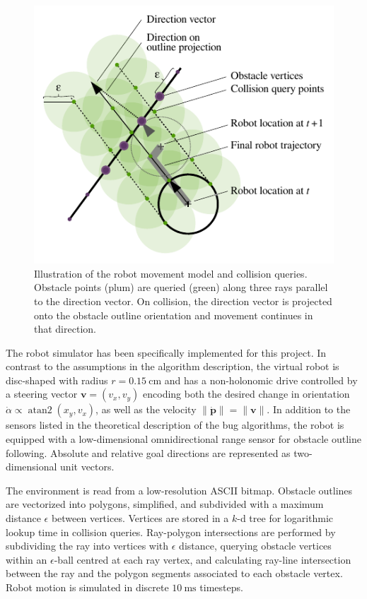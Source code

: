 \documentclass[letterpaper,10pt,conference]{ieeeconf}
\renewcommand{\vec}[1]{\bm{#1}}
\DeclareMathOperator{\atantwo}{atan2}
\begin{document}
\begin{figure}
	\centering
	\includegraphics{media/robot_environment.pdf}
	\caption{Illustration of the robot movement model and collision queries. Obstacle points (plum) are queried (green) along three rays parallel to the direction vector. On collision, the direction vector is projected onto the obstacle outline orientation and movement continues in that direction.}
	\label{fig:robot_environment}
\end{figure}

The robot simulator has been specifically implemented for this project. In contrast to the assumptions in the algorithm description, the virtual robot is disc-shaped with radius $r = \SI{0.15}{\centi\meter}$ and has a non-holonomic drive controlled by a steering vector $\vec v = (v_x, v_y)$ encoding both the desired change in orientation $\dot \alpha \propto \atantwo(x_y, v_x)$, as well as the velocity $\| \dot {\vec p} \| = \|\vec v\|$. In addition to the sensors listed in the theoretical description of the bug algorithms, the robot is equipped with a low-dimensional omnidirectional range sensor for obstacle outline following. Absolute and relative goal directions are represented as two-dimensional unit vectors.

The environment is read from a low-resolution ASCII bitmap. Obstacle outlines are vectorized into polygons, simplified, and subdivided with a maximum distance $\epsilon$ between vertices. Vertices are stored in a $k$-d tree \cite{bentley1975multidimensional} for logarithmic lookup time in collision queries. Ray-polygon intersections are performed by subdividing the ray into vertices with $\epsilon$ distance, querying obstacle vertices within an $\epsilon$-ball centred at each ray vertex, and calculating ray-line intersection between the ray and the polygon segments associated to each obstacle vertex. Robot motion is simulated in discrete $\SI{10}{\milli\second}$ timesteps.
\end{document}
